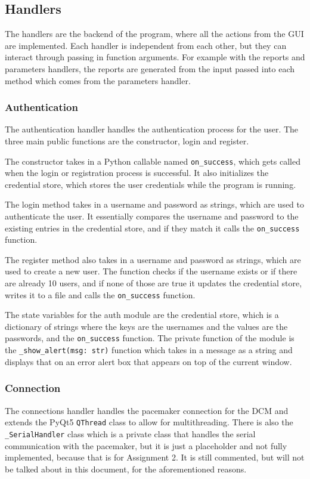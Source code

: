 \documentclass[12pt]{article}
\begin{document}
\subsection{Handlers}
The handlers are the backend of the program, where all the actions from the GUI are implemented. Each handler is independent from each other, but they can interact through passing in function arguments. For example with the reports and parameters handlers, the reports are generated from the input passed into each method which comes from the parameters handler.

\subsubsection{Authentication}
The authentication handler handles the authentication process for the user. The three main public functions are the constructor, login and register.

The constructor takes in a Python callable named \verb|on_success|, which gets called when the login or registration process is successful.
It also initializes the credential store, which stores the user credentials while the program is running.

The login method takes in a username and password as strings, which are used to authenticate the user. It essentially compares the username and password to the existing entries in the credential store, and if they match it calls the \verb|on_success| function.

The register method also takes in a username and password as strings, which are used to create a new user. The function checks if the username exists or if there are already 10 users, and if none of those are true it updates the credential store, writes it to a file and calls the \verb|on_success| function.

The state variables for the auth module are the credential store, which is a dictionary of strings where the keys are the usernames and the values are the passwords, and the \verb|on_success| function. The private function of the module is the \verb|_show_alert(msg: str)| function which takes in a message as a string and displays that on an error alert box that appears on top of the current window.

\subsubsection{Connection}
The connections handler handles the pacemaker connection for the DCM and extends the PyQt5 \verb|QThread| class to allow for multithreading.
There is also the \verb|_SerialHandler| class which is a private class that handles the serial communication with the pacemaker, but it is just a placeholder and not fully implemented, because that is for Assignment 2.
It is still commented, but will not be talked about in this document, for the aforementioned reasons.
\end{document}
